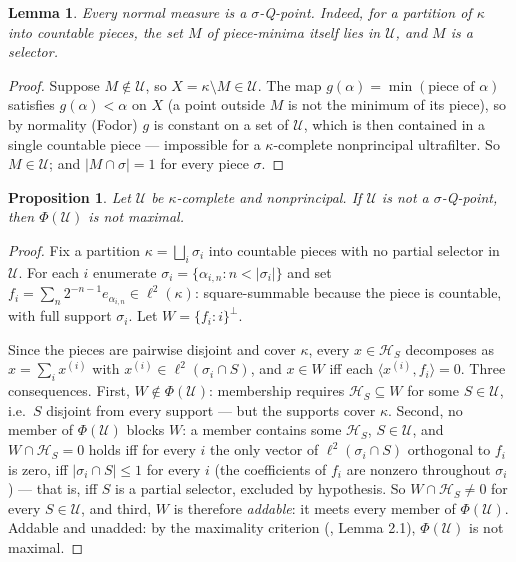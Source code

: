 \documentclass[11pt,reqno]{amsart}
\newtheorem{proposition}[theorem]{Proposition}
\newtheorem{lemma}[theorem]{Lemma}
\theoremstyle{definition}
\newcommand{\HH}{\mathcal{H}}
\newcommand{\U}{\mathcal{U}}
\newcommand{\lk}{\ell^2(\kappa)}
\begin{document}
\begin{lemma}\label{lem:normal-sigmaQ}
Every normal measure is a $\sigma$-Q-point. Indeed, for a partition of $\kappa$
into countable pieces, the set $M$ of piece-minima itself lies in $\U$, and $M$
is a selector.
\end{lemma}

\begin{proof}
Suppose $M\notin\U$, so $X=\kappa\setminus M\in\U$. The map
$g(\alpha)=\min(\text{piece of }\alpha)$ satisfies $g(\alpha)<\alpha$ on $X$
(a point outside $M$ is not the minimum of its piece), so by normality
(Fodor) $g$ is constant on a set of $\U$, which is then contained in a single
countable piece --- impossible for a $\kappa$-complete nonprincipal ultrafilter.
So $M\in\U$; and $|M\cap\sigma|=1$ for every piece $\sigma$.
\end{proof}

\begin{proposition}\label{prop:kappa-witness}
Let $\U$ be $\kappa$-complete and nonprincipal. If $\U$ is \emph{not} a
$\sigma$-Q-point, then $\Phi(\U)$ is not maximal.
\end{proposition}

\begin{proof}
Fix a partition $\kappa=\bigsqcup_i\sigma_i$ into countable pieces with no
partial selector in $\U$. For each $i$ enumerate $\sigma_i=\{\alpha_{i,n}:n<
|\sigma_i|\}$ and set $f_i=\sum_n2^{-n-1}e_{\alpha_{i,n}}\in\lk$: square-summable
because the piece is countable, with full support $\sigma_i$. Let $W=\{f_i:i\}^\perp$.

Since the pieces are pairwise disjoint and cover $\kappa$, every $x\in\HH_S$
decomposes as $x=\sum_ix^{(i)}$ with $x^{(i)}\in\ell^2(\sigma_i\cap S)$, and
$x\in W$ iff each $\langle x^{(i)},f_i\rangle=0$. Three consequences. First,
$W\notin\Phi(\U)$: membership requires $\HH_S\subseteq W$ for some $S\in\U$,
i.e.\ $S$ disjoint from every support --- but the supports cover $\kappa$.
Second, no member of $\Phi(\U)$ blocks $W$: a member contains some $\HH_S$,
$S\in\U$, and $W\cap\HH_S=0$ holds iff for every $i$ the only vector of
$\ell^2(\sigma_i\cap S)$ orthogonal to $f_i$ is zero, iff $|\sigma_i\cap S|\le1$
for every $i$ (the coefficients of $f_i$ are nonzero throughout $\sigma_i$) ---
that is, iff $S$ is a partial selector, excluded by hypothesis. So
$W\cap\HH_S\neq0$ for every $S\in\U$, and third, $W$ is therefore
\emph{addable}: it meets every member of $\Phi(\U)$. Addable and unadded:
by the maximality criterion (\cite{FWI}, Lemma 2.1), $\Phi(\U)$ is not maximal.
\end{proof}
\end{document}
